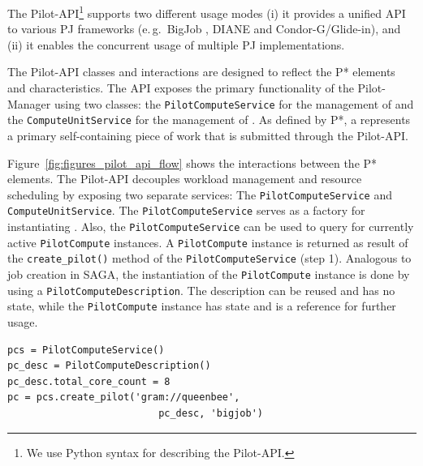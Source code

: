 \documentclass{sig-alternate}
\begin{document}
The Pilot-API\footnote{We use Python syntax for describing the
  Pilot-API.}  supports two different usage modes (i) it provides a
unified API to various PJ frameworks (e.\,g.\ BigJob , DIANE and
Condor-G/Glide-in), and (ii) it enables the concurrent usage of
multiple PJ implementations.

The Pilot-API classes and interactions are designed to reflect the P*
elements and characteristics.
The API exposes the primary functionality of the Pilot-Manager using two
classes: the \texttt{Pilot\-Compute\-Service} for the management of \pilots
and the \texttt{Compute\-Unit\-Service} for the management of \cus. 
As defined by P*, a \cu represents a primary self-containing piece of work that
is submitted through the Pilot-API. 

Figure~\ref{fig:figures_pilot_api_flow} shows the interactions between the
P* elements.
The Pilot-API decouples workload management and resource scheduling by exposing
two separate services: The \texttt{Pilot\-Compute\-Service} and
\texttt{Compute\-Unit\-Service}. 
The \texttt{Pilot\-Compute\-Service} serves as a factory for instantiating \pilots. 
Also, the \texttt{Pilot\-Compute\-Service} can be used to query for currently
active \texttt{Pilot\-Compute} instan\-ces.
A \texttt{Pilot\-Compute} instance is returned as result of the
\texttt{create\_pilot()} method of the \texttt{Pi\-lot\-Compute\-Service} (step 1).
Analogous to job creation in SAGA, the instantiation of the
\texttt{Pilot\-Compute} instance is done by using a
\texttt{Pilot\-ComputeDescription}. The description can be reused and has no
state, while the \texttt{Pilot\-Compute} instance has state and is a reference
for further usage.\\

\lstset{
language=Python,
frame=single,
captionpos=b,
stringstyle=\ttfamily,
basicstyle=\scriptsize\ttfamily
}

\begin{minipage}{0.45 \textwidth}
\begin{lstlisting}[caption={\textbf{Pilot Creation:} Instantiation of a Pilot Service using a Pilot Compute Description.}, label={lst:pcs_creation}]
pcs = PilotComputeService()
pc_desc = PilotComputeDescription()
pc_desc.total_core_count = 8
pc = pcs.create_pilot('gram://queenbee', 
                          pc_desc, 'bigjob')
\end{lstlisting}
\end{minipage}
\end{document}
